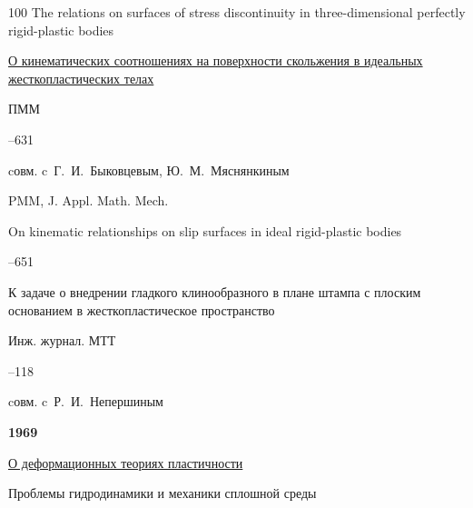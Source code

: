 \begin{thebibliography}{100}
\paper The relations on surfaces of stress discontinuity in three-dimensional perfectly rigid-plastic bodies






\paper \href{https://zbmath.org/?q=an:0179.55701}{О кинематических соотношениях на поверхности скольжения в идеальных жесткопластических телах}

\jour ПММ




–631 


\miscnote cовм. c~Г.~И.~Быковцевым, Ю.~М.~Мяснянкиным

\transl


\jour PMM, J. Appl. Math. Mech. 

\paper On kinematic relationships on slip surfaces in ideal rigid-plastic bodies



--651





\paper К задаче о внедрении гладкого клинообразного в плане штампа с плоским основанием в жесткопластическое пространство 

\jour Инж. журнал. МТТ



–118 

\miscnote cовм. c~Р.~И.~Непершиным



\item[] \centerline{\bf 1969}




\paper \href{https://zbmath.org/?q=an:0205.56105}{О деформационных теориях пластичности}


\inbook Проблемы гидродинамики и механики сплошной среды


\end{thebibliography}
